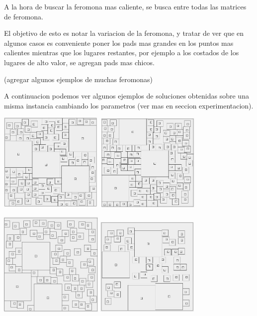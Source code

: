 A la hora de buscar la feromona mas caliente, se busca entre todas las matrices de feromona.

El objetivo de esto es notar la variacion de la feromona, y tratar de ver que en algunos casos es conveniente poner los pads mas grandes en los puntos mas calientes mientras que los lugares restantes, por ejemplo a los costados de los lugares de alto valor, se agregan pads mas chicos. 

(agregar algunos ejemplos de muchas feromonas)

A continuacion podemos ver algunos ejemplos de soluciones obtenidas sobre una misma instancia cambiando los parametros (ver mas en seccion experimentacion).

\begin{center}

\includegraphics[width=5cm]{imagenes/ejemplo7}
\includegraphics[width=5cm]{imagenes/ejemplo5}
\end{center}


\begin{center}
\includegraphics[width=5cm]{imagenes/ejemplo6}
\includegraphics[width=5cm]{imagenes/ejemplo4}

\end{center}

